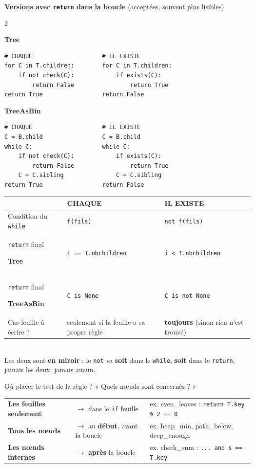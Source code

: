 \documentclass[10pt,a4paper]{article}
\newcommand{\code}[1]{\texttt{#1}}
\newcommand{\tc}[1]{\textcolor{treec}{\texttt{#1}}}   %
\newcommand{\bc}[1]{\textcolor{tabc}{\texttt{#1}}}    %
\newcommand{\TREE}{\colorbox{treec}{\color{white}\strut\small\bfseries\ttfamily Tree}}
\newcommand{\TAB}{\colorbox{tabc}{\color{white}\strut\small\bfseries\ttfamily TreeAsBin}}
\begin{document}
\textbf{Versions avec \code{return} dans la boucle} (accept\'ees, souvent plus lisibles)
\begin{multicols}{2}
\TREE
\begin{lstlisting}[style=tree]
# CHAQUE                    # IL EXISTE
for C in T.children:        for C in T.children:
    if not check(C):            if exists(C):
        return False                return True
return True                 return False
\end{lstlisting}
\columnbreak
\TAB
\begin{lstlisting}[style=tab]
# CHAQUE                    # IL EXISTE
C = B.child                 C = B.child
while C:                    while C:
    if not check(C):            if exists(C):
        return False                return True
    C = C.sibling               C = C.sibling
return True                 return False
\end{lstlisting}
\end{multicols}

\begin{center}
\renewcommand{\arraystretch}{1.15}
\begin{tabular}{l l l}
\toprule
 & \textbf{CHAQUE} & \textbf{IL EXISTE}\\
\midrule
Condition du \code{while} & \code{f(fils)} & \code{not f(fils)}\\
\code{return} final \TREE & \tc{i == T.nbchildren} & \tc{i < T.nbchildren}\\
\code{return} final \TAB & \bc{C is None} & \bc{C is not None}\\
Cas feuille \`a \'ecrire ? & seulement si la feuille a sa propre r\`egle & \textbf{toujours} (sinon rien n'est trouv\'e)\\
\bottomrule
\end{tabular}\\[3pt]
{\small Les deux sont \textbf{en miroir} : le \code{not} va \textbf{soit} dans le \code{while}, \textbf{soit} dans le \code{return}, jamais les deux, jamais aucun.}
\end{center}

\begin{boxok}{O\`u placer le test de la r\`egle ? « Quels n\oe uds sont concern\'es ? »}
\renewcommand{\arraystretch}{1.1}
\begin{tabular}{l l l}
\textbf{Les feuilles seulement} & $\to$ dans le \code{if} feuille & ex. even\_leaves : \code{return T.key \% 2 == 0}\\
\textbf{Tous les n\oe uds} & $\to$ au \textbf{d\'ebut}, avant la boucle & ex. heap\_min, path\_below, deep\_enough\\
\textbf{Les n\oe uds internes} & $\to$ \textbf{apr\`es} la boucle & ex. check\_sum : \code{... and s == T.key}\\
\end{tabular}
\end{boxok}
\end{document}
